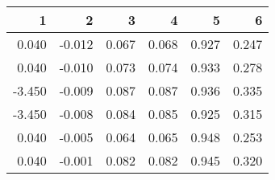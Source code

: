 \begin{table}[ht]
\centering
\begin{tabular}{rrrrrr}
  \hline
1 & 2 & 3 & 4 & 5 & 6 \\ 
  \hline
0.040 & -0.012 & 0.067 & 0.068 & 0.927 & 0.247 \\ 
  0.040 & -0.010 & 0.073 & 0.074 & 0.933 & 0.278 \\ 
  -3.450 & -0.009 & 0.087 & 0.087 & 0.936 & 0.335 \\ 
  -3.450 & -0.008 & 0.084 & 0.085 & 0.925 & 0.315 \\ 
  0.040 & -0.005 & 0.064 & 0.065 & 0.948 & 0.253 \\ 
  0.040 & -0.001 & 0.082 & 0.082 & 0.945 & 0.320 \\ 
   \hline
\end{tabular}
\end{table}
